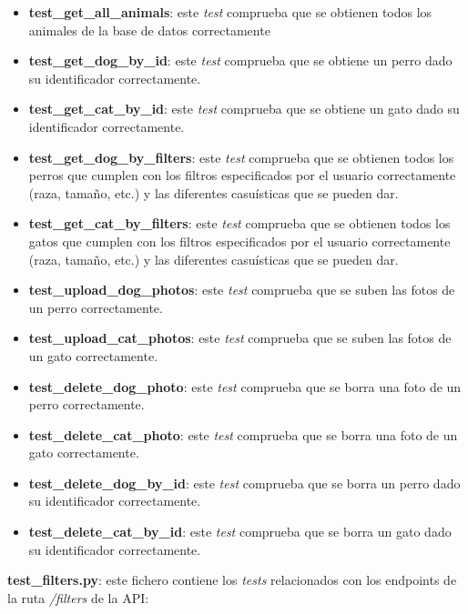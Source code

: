 \begin{itemize}
    \item \textbf{test\_get\_all\_animals}: este \textit{test} comprueba que se obtienen todos los animales de la base de datos correctamente
    \item \textbf{test\_get\_dog\_by\_id}: este \textit{test} comprueba que se obtiene un perro dado su identificador correctamente.
    \item \textbf{test\_get\_cat\_by\_id}: este \textit{test} comprueba que se obtiene un gato dado su identificador correctamente.
    \item \textbf{test\_get\_dog\_by\_filters}: este \textit{test} comprueba que se obtienen todos los perros que cumplen con los filtros
    especificados por el usuario correctamente (raza, tamaño, etc.) y las diferentes casuísticas que se pueden dar.
    \item \textbf{test\_get\_cat\_by\_filters}: este \textit{test} comprueba que se obtienen todos los gatos que cumplen con los filtros
    especificados por el usuario correctamente (raza, tamaño, etc.) y las diferentes casuísticas que se pueden dar.
    \item \textbf{test\_upload\_dog\_photos}: este \textit{test} comprueba que se suben las fotos de un perro correctamente.
    \item \textbf{test\_upload\_cat\_photos}: este \textit{test} comprueba que se suben las fotos de un gato correctamente.
    \item \textbf{test\_delete\_dog\_photo}: este \textit{test} comprueba que se borra una foto de un perro correctamente.
    \item \textbf{test\_delete\_cat\_photo}: este \textit{test} comprueba que se borra una foto de un gato correctamente.
    \item \textbf{test\_delete\_dog\_by\_id}: este \textit{test} comprueba que se borra un perro dado su identificador correctamente.
    \item \textbf{test\_delete\_cat\_by\_id}: este \textit{test} comprueba que se borra un gato dado su identificador correctamente.
\end{itemize}

\textbf{test\_filters.py}: este fichero contiene los \textit{tests} relacionados con los endpoints de la ruta \textit{/filters} de la API:

